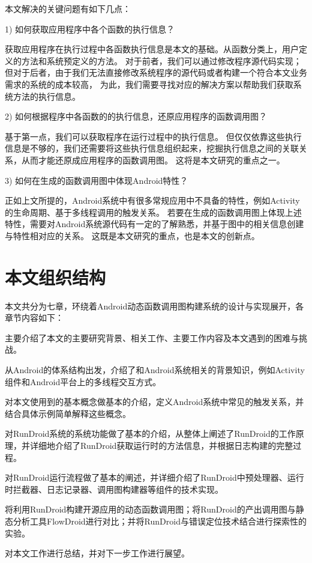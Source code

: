 本文解决的关键问题有如下几点：

1)	如何获取应用程序中各个函数的执行信息？

获取应用程序在执行过程中各函数执行信息是本文的基础。从函数分类上，用户定义的方法和系统预定义的方法。
对于前者，我们可以通过修改程序源代码实现；但对于后者，由于我们无法直接修改系统程序的源代码或者构建一个符合本文业务需求的系统的成本较高，
为此，我们需要寻找对应的解决方案以帮助我们获取系统方法的执行信息。

2)	如何根据程序中各函数的的执行信息，还原应用程序的函数调用图？

基于第一点，我们可以获取程序在运行过程中的执行信息。
但仅仅依靠这些执行信息是不够的，我们还需要将这些执行信息组织起来，挖掘执行信息之间的关联关系，从而才能还原成应用程序的函数调用图。
这将是本文研究的重点之一。

3)	如何在生成的函数调用图中体现Android特性？

正如上文所提的，Android系统中有很多常规应用中不具备的特性，例如Activity的生命周期、基于多线程调用的触发关系。
若要在生成的函数调用图上体现上述特性，需要对Android系统源代码有一定的了解熟悉，并基于图中的相关信息创建与特性相对应的关系。
这既是本文研究的重点，也是本文的创新点。


\section{本文组织结构}


本文共分为七章，环绕着Android动态函数调用图构建系统的设计与实现展开，各章节内容如下：

主要介绍了本文的主要研究背景、相关工作、主要工作内容及本文遇到的困难与挑战。

从Android的体系结构出发，介绍了和Android系统相关的背景知识，例如Activity组件和Android平台上的多线程交互方式。

对本文使用到的基本概念做基本的介绍，定义Android系统中常见的触发关系，并结合具体示例简单解释这些概念。


对RunDroid系统的系统功能做了基本的介绍，从整体上阐述了RunDroid的工作原理，并详细地介绍了RunDroid获取运行时的方法信息，并根据日志构建\ecg 的完整过程。


对RunDroid运行流程做了基本的阐述，并详细介绍了RunDroid中预处理器、运行时拦截器、日志记录器、调用图构建器等组件的技术实现。

 将利用RunDroid构建开源应用的动态函数调用图；将RunDroid的产出调用图与静态分析工具FlowDroid进行对比；并将RunDroid与错误定位技术结合进行探索性的实验。

对本文工作进行总结，并对下一步工作进行展望。


